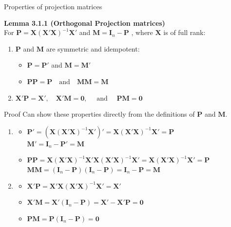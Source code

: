 \documentclass[10pt]{beamer}
\begin{document}
\begin{frame}[fragile]{Properties of projection matrices}
\item\textbf{ Lemma 3.1.1 (Orthogonal Projection matrices)}\\
For $\mathbf{P}=\mathbf{X}(\mathbf{X}'\mathbf{X})^{-1}\mathbf{X}'$ and
$\mathbf{M}=\mathbf{I}_n-\mathbf{P}$ , where $\mathbf{X}$ is of full rank:

\begin{enumerate}
\item $\mathbf{P}$ and $\mathbf{M}$ are symmetric and idempotent:
\begin{itemize}
\item $\mathbf{P}=\mathbf{P}'$   and  $\mathbf{M}=\mathbf{M}'$

\item $\mathbf{P}\mathbf{P}=\mathbf{P}\quad\text{and}\quad \mathbf{M}\mathbf{M}=\mathbf{M}$
\end{itemize}
\bigskip
\item $\mathbf{X}'\mathbf{P}=\mathbf{X}',\quad \mathbf{X}'\mathbf{M}=\mathbf{0},\quad\text{ and }\quad \mathbf{P}\mathbf{M}=\mathbf{0}$
\end{enumerate}
\end{frame}

\begin{frame}{Proof}
Can show these properties directly from the definitions of $\mathbf{P}$ and $\mathbf{M}$.\
\begin{enumerate}
\item 
\begin{itemize}
\item $\mathbf{P}'=(\mathbf{X}(\mathbf{X}'\mathbf{X})^{-1}\mathbf{X}')'=\mathbf{X}(\mathbf{X}'\mathbf{X})^{-1}\mathbf{X}'=\mathbf{P}$ \\
$\mathbf{M}'=\mathbf{I}_n-\mathbf{P}'=\mathbf{M}$ 


\item $\mathbf{P}\mathbf{P}=\mathbf{X}(\mathbf{X}'\mathbf{X})^{-1}\mathbf{X}'\mathbf{X}(\mathbf{X}'\mathbf{X})^{-1}\mathbf{X}'=\mathbf{X}(\mathbf{X}'\mathbf{X})^{-1}\mathbf{X}'=\mathbf{P}$\\

$\mathbf{M}\mathbf{M}=(\mathbf{I}_n-\mathbf{P})(\mathbf{I}_n-\mathbf{P})=\mathbf{I}_n-\mathbf{P}=\mathbf{M}$

\end{itemize}

\bigskip

\item
\begin{itemize}
\item $\mathbf{X}'\mathbf{P}=\mathbf{X}'\mathbf{X}(\mathbf{X}'\mathbf{X})^{-1}\mathbf{X}'=\mathbf{X}'$
\item $\mathbf{X}'\mathbf{M}=\mathbf{X}'(\mathbf{I}_n-\mathbf{P})=\mathbf{X}'-\mathbf{X}'\mathbf{P}=\mathbf{0}$
\item $\mathbf{P}\mathbf{M}=\mathbf{P}(\mathbf{I}_n-\mathbf{P})=\mathbf{0}$

\end{itemize}
\end{enumerate}
\end{frame}
\end{document}
